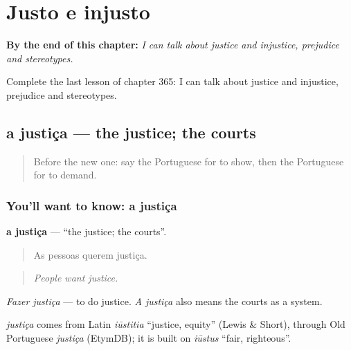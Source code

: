 
\chapter{Justo e injusto}
\label{ch:pt-justo-e-injusto}

\begin{chapteropening}
\textbf{By the end of this chapter:} \emph{I can talk about justice and injustice, prejudice and stereotypes.}

Complete the last lesson of chapter 365: I can talk about justice and injustice, prejudice and stereotypes.
\end{chapteropening}

\section[a justiça]{a justiça — the justice; the courts}

\label{lesson:PT-C365-justica}



\begin{quote}
Before the new one: say the Portuguese for to show, then the Portuguese for to demand.
\end{quote}

\subsection*{You'll want to know: a justiça}
\textbf{a justiça} — \textquotedblleft{}the justice; the courts\textquotedblright{}.

\begin{quote}
As pessoas querem justiça.
\end{quote}

\begin{quote}
\emph{People want justice.}
\end{quote}

\emph{Fazer justiça} — to do justice. \emph{A justiça} also means the courts as a system.

\begin{cousinweb}
\emph{justiça} comes from Latin \emph{iūstitia} \textquotedblleft{}justice, equity\textquotedblright{} (Lewis \& Short), through Old Portuguese \emph{justiça} (EtymDB); it is built on \emph{iūstus} \textquotedblleft{}fair, righteous\textquotedblright{}.
\end{cousinweb}


